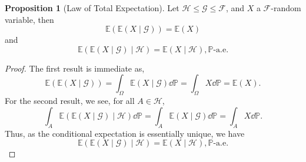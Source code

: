 \documentclass[]{article}
\theoremstyle{definition}
\newtheorem{prop}{Proposition}
\theoremstyle{definition}
\begin{document}
\begin{prop}[Law of Total Expectation]
  Let \(\mathcal{H} \le \mathcal{G} \le \mathcal{F}\), and \(X\) a 
  \(\mathcal{F}\)-random variable, then 
  \[\mathbb{E}(\mathbb{E}(X \mid \mathcal{G})) = \mathbb{E}(X)\]
  and 
  \[\mathbb{E}(\mathbb{E}(X \mid \mathcal{G}) \mid \mathcal{H}) = 
    \mathbb{E}(X \mid \mathcal{H}),\mathbb{P}\text{-a.e.}\]
\end{prop}
\begin{proof}
  The first result is immediate as,
  \[\mathbb{E}(\mathbb{E}(X \mid \mathcal{G})) 
    = \int_\Omega \mathbb{E}(X \mid \mathcal{G}) \dd \mathbb{P} 
    = \int_\Omega X \dd \mathbb{P} = \mathbb{E}(X).\]
  For the second result, we see, for all \(A \in \mathcal{H}\),
  \[\int_A \mathbb{E}(\mathbb{E}(X \mid \mathcal{G}) \mid \mathcal{H}) \dd \mathbb{P}
    = \int_A \mathbb{E}(X \mid \mathcal{G}) \dd \mathbb{P}
    = \int_A X \dd \mathbb{P}.\]
  Thus, as the conditional expectation is essentially unique, we have 
  \[\mathbb{E}(\mathbb{E}(X \mid \mathcal{G}) \mid \mathcal{H}) = 
    \mathbb{E}(X \mid \mathcal{H}), \mathbb{P}\text{-a.e.}\]
\end{proof}
\end{document}
